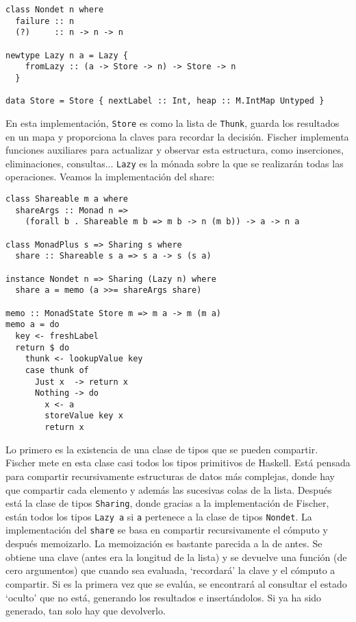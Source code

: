 \documentclass[class=article, crop=false]{standalone}
\begin{document}
\begin{verbatim}
class Nondet n where
  failure :: n
  (?)     :: n -> n -> n

newtype Lazy n a = Lazy {
    fromLazy :: (a -> Store -> n) -> Store -> n
  }

data Store = Store { nextLabel :: Int, heap :: M.IntMap Untyped }
\end{verbatim}

En esta implementación, \verb`Store` es como la lista de \verb`Thunk`, guarda los resultados
en un mapa y proporciona la claves para recordar la decisión. Fischer implementa funciones
auxiliares para actualizar y observar esta estructura, como inserciones, eliminaciones,
consultas... \verb`Lazy` es la mónada sobre la que se realizarán todas las operaciones.
Veamos la implementación del share:

\begin{verbatim}
class Shareable m a where
  shareArgs :: Monad n =>
    (forall b . Shareable m b => m b -> n (m b)) -> a -> n a

class MonadPlus s => Sharing s where
  share :: Shareable s a => s a -> s (s a)

instance Nondet n => Sharing (Lazy n) where
  share a = memo (a >>= shareArgs share)

memo :: MonadState Store m => m a -> m (m a)
memo a = do
  key <- freshLabel
  return $ do
    thunk <- lookupValue key
    case thunk of
      Just x  -> return x
      Nothing -> do
        x <- a
        storeValue key x
        return x
\end{verbatim}

Lo primero es la existencia de una clase de tipos que se pueden compartir. Fischer mete en
esta clase casi todos los tipos primitivos de Haskell. Está pensada para compartir
recursivamente estructuras de datos más complejas, donde hay que compartir cada elemento y
además las sucesivas colas de la lista. Después está la clase de tipos \verb`Sharing`, donde
gracias a la implementación de Fischer, están todos los tipos \verb`Lazy a` si \verb`a`
pertenece a la clase de tipos \verb`Nondet`. La implementación del \verb`share` se basa en
compartir recursivamente el cómputo y después memoizarlo. La memoización es bastante parecida
a la de antes. Se obtiene una clave (antes era la longitud de la lista) y se devuelve una
función (de cero argumentos) que cuando sea evaluada, `recordará' la clave y el cómputo a
compartir. Si es la primera vez que se evalúa, se encontrará al consultar el estado `oculto'
que no está, generando los resultados e insertándolos. Si ya ha sido generado, tan solo hay
que devolverlo.
\end{document}
